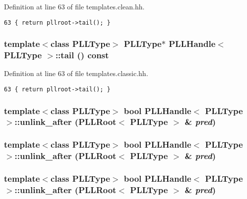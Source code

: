 Definition at line 63 of file templates.clean.hh.



\footnotesize\begin{verbatim}63 { return pllroot->tail(); } 
\end{verbatim}\normalsize 
{}
\subsubsection{\setlength{\rightskip}{0pt plus 5cm}template$<$class PLLType$>$ {\bf PLLType}$\ast$ PLLHandle$<$ {\bf PLLType} $>$::tail () const\hspace{0.3cm}{\tt  [inline]}}\label{classPLLHandle_a4}




Definition at line 63 of file templates.classic.hh.



\footnotesize\begin{verbatim}63 { return pllroot->tail(); } 
\end{verbatim}\normalsize 
{}
\subsubsection{\setlength{\rightskip}{0pt plus 5cm}template$<$class PLLType$>$ bool PLLHandle$<$ {\bf PLLType} $>$::unlink\_\-after ({\bf PLLRoot}$<$ {\bf PLLType} $>$ \& {\em pred})\hspace{0.3cm}{\tt  [inline]}}\label{classPLLHandle_a50}


\subsubsection{\setlength{\rightskip}{0pt plus 5cm}template$<$class PLLType$>$ bool PLLHandle$<$ {\bf PLLType} $>$::unlink\_\-after ({\bf PLLRoot}$<$ {\bf PLLType} $>$ \& {\em pred})\hspace{0.3cm}{\tt  [inline]}}\label{classPLLHandle_a37}


\subsubsection{\setlength{\rightskip}{0pt plus 5cm}template$<$class PLLType$>$ bool PLLHandle$<$ {\bf PLLType} $>$::unlink\_\-after ({\bf PLLRoot}$<$ {\bf PLLType} $>$ \& {\em pred})\hspace{0.3cm}{\tt  [inline]}}\label{classPLLHandle_a24}


